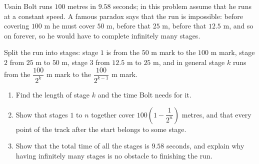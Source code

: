 Usain Bolt runs $100$ metres in $9.58$ seconds; in this problem assume that he runs at a constant speed. A famous paradox says that the run is impossible: before covering $100$ m he must cover $50$ m, before that $25$ m, before that $12.5$ m, and so on forever, so he would have to complete infinitely many stages.

Split the run into stages: stage $1$ is from the $50$ m mark to the $100$ m mark, stage $2$ from $25$ m to $50$ m, stage $3$ from $12.5$ m to $25$ m, and in general stage $k$ runs from the $\dfrac{100}{2^k}$ m mark to the $\dfrac{100}{2^{k-1}}$ m mark.
\begin{enumerate}
\item[(a)] Find the length of stage $k$ and the time Bolt needs for it.
\item[(b)] Show that stages $1$ to $n$ together cover $100\left(1-\dfrac{1}{2^n}\right)$ metres, and that every point of the track after the start belongs to some stage.
\item[(c)] Show that the total time of all the stages is $9.58$ seconds, and explain why having infinitely many stages is no obstacle to finishing the run.
\end{enumerate}

